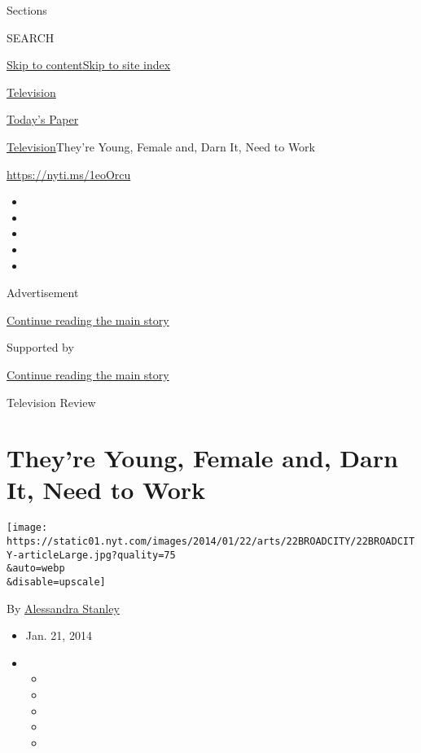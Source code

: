 Sections

SEARCH

\protect\hyperlink{site-content}{Skip to
content}\protect\hyperlink{site-index}{Skip to site index}

\href{https://www.nytimes.com/section/arts/television}{Television}

\href{https://myaccount.nytimes.com/auth/login?response_type=cookie\&client_id=vi}{}

\href{https://www.nytimes.com/section/todayspaper}{Today's Paper}

\href{/section/arts/television}{Television}\textbar{}They're Young,
Female and, Darn It, Need to Work

\href{https://nyti.ms/1eoOrcu}{https://nyti.ms/1eoOrcu}

\begin{itemize}
\item
\item
\item
\item
\item
\end{itemize}

Advertisement

\protect\hyperlink{after-top}{Continue reading the main story}

Supported by

\protect\hyperlink{after-sponsor}{Continue reading the main story}

Television Review

\hypertarget{theyre-young-female-and-darn-it-need-to-work}{%
\section{They're Young, Female and, Darn It, Need to
Work}\label{theyre-young-female-and-darn-it-need-to-work}}

\texttt{[image: https://static01.nyt.com/images/2014/01/22/arts/22BROADCITY/22BROADCITY-articleLarge.jpg?quality=75\\\&auto=webp\\\&disable=upscale]}

By \href{http://www.nytimes.com/by/alessandra-stanley}{Alessandra
Stanley}

\begin{itemize}
\item
  Jan. 21, 2014
\item
  \begin{itemize}
  \item
  \item
  \item
  \item
  \item
  \end{itemize}
\end{itemize}

